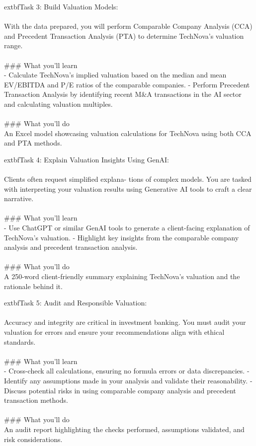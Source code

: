 \documentclass{article}
\begin{document}
	extbf{Task 3:} Build Valuation Models:  \\
 \\
 With the data prepared, you will perform Comparable Company Analysis (CCA) and Precedent Transaction Analysis (PTA) to determine TechNova’s valuation range. \\
 \\
### What you'll learn \\
- Calculate TechNova’s implied valuation based on the median and mean EV/EBITDA and P/E ratios of the comparable companies. - Perform Precedent Transaction Analysis by identifying recent M&A transactions in the AI sector and calculating valuation multiples. \\
 \\
### What you'll do \\
An Excel model showcasing valuation calculations for TechNova using both CCA and PTA methods.

	extbf{Task 4:} Explain Valuation Insights Using GenAI:  \\
 \\
 Clients often request simplified explana- tions of complex models. You are tasked with interpreting your valuation results using Generative AI tools to craft a clear narrative. \\
 \\
### What you'll learn \\
- Use ChatGPT or similar GenAI tools to generate a client-facing explanation of TechNova’s valuation. - Highlight key insights from the comparable company analysis and precedent transaction analysis. \\
 \\
### What you'll do \\
A 250-word client-friendly summary explaining TechNova’s valuation and the rationale behind it.

	extbf{Task 5:} Audit and Responsible Valuation:  \\
 \\
 Accuracy and integrity are critical in investment banking. You must audit your valuation for errors and ensure your recommendations align with ethical standards. \\
 \\
### What you'll learn \\
- Cross-check all calculations, ensuring no formula errors or data discrepancies. - Identify any assumptions made in your analysis and validate their reasonability. - Discuss potential risks in using comparable company analysis and precedent transaction methods. \\
 \\
### What you'll do \\
An audit report highlighting the checks performed, assumptions validated, and risk considerations.
\end{document}
